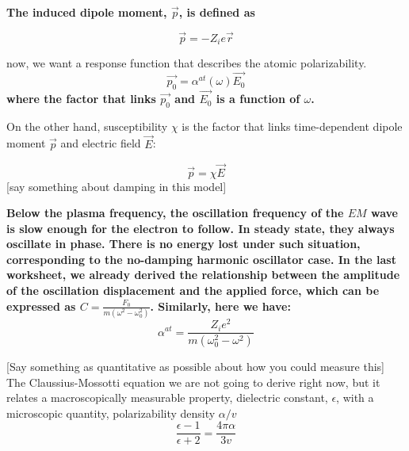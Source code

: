 \documentclass[]{revtex4}
\newcommand{\st}[1]{{\color{red}\bfseries #1}}
\begin{document}
  \st{The induced dipole moment, $\vec{p}$, is defined as}
  
  \[\vec{p}=-Z_ie\vec{r}\]
  
  now, we want a response function that describes the atomic polarizability.
  \[\vec{p_0} = \alpha^{at}(\omega)\vec{E_0}\]
  \st{
    where the factor that links $\vec{p_0}$ and $\vec{E_0}$ is a function of $\omega$.
  }
  \st{
    
    On the other hand, susceptibility $\chi$ is the factor that links time-dependent dipole moment $\vec{p}$ and electric field $\vec{E}$:
  }
  \[\vec{p} = \chi\vec{E}\]
  [say something about damping in this model]
  
  \st{
    Below the plasma frequency, the oscillation frequency of the $EM$ wave is slow enough for the electron to follow. In steady state, they always oscillate in phase. There is no energy lost under such situation, corresponding to the no-damping harmonic oscillator case. In the last worksheet, we already derived the relationship between the amplitude of the oscillation displacement and the applied force, which can be expressed as $C = \frac{F_0}{m(\omega^2 - \omega^2_0)}$. Similarly, here we have:
  }
  \[\alpha^{at}=\frac{Z_ie^2}{m(\omega_0^2-\omega^2)}\]
  
  [Say something as quantitative as possible about how you could measure this]
  The Claussius-Mossotti equation we are not going to derive right now, but it relates a macroscopically measurable property, dielectric constant, $\epsilon$, with
  a microscopic quantity, polarizability density $\alpha/v$
  \[\frac{\epsilon-1}{\epsilon + 2}=\frac{4\pi\alpha}{3v}\]
  
\end{document}
